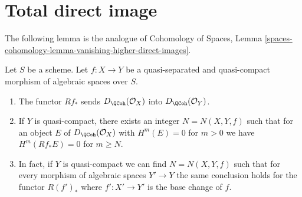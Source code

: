 \section{Total direct image}
\label{section-total-direct-image}

\noindent
The following lemma is the analogue of
Cohomology of Spaces, Lemma
\ref{spaces-cohomology-lemma-vanishing-higher-direct-images}.

\begin{lemma}
\label{lemma-quasi-coherence-direct-image}
Let $S$ be a scheme. Let $f : X \to Y$ be a quasi-separated and quasi-compact
morphism of algebraic spaces over $S$.
\begin{enumerate}
\item The functor $Rf_*$ sends $D_\QCoh(\mathcal{O}_X)$
into $D_\QCoh(\mathcal{O}_Y)$.
\item If $Y$ is quasi-compact, there exists an integer $N = N(X, Y, f)$
such that for an object $E$ of $D_\QCoh(\mathcal{O}_X)$
with $H^m(E) = 0$ for $m > 0$ we have
$H^m(Rf_*E) = 0$ for $m \geq N$.
\item In fact, if $Y$ is quasi-compact we can find $N = N(X, Y, f)$
such that for every morphism of algebraic spaces $Y' \to Y$
the same conclusion holds for the functor $R(f')_*$
where $f' : X' \to Y'$ is the base change of $f$.
\end{enumerate}
\end{lemma}

